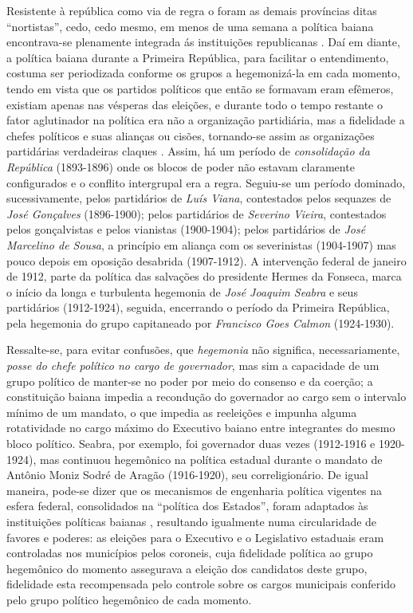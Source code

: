 Resistente à república como via de regra o foram as demais províncias ditas ``nortistas'', cedo, cedo mesmo, em menos de uma semana a política baiana encontrava-se plenamente integrada ás instituições republicanas \cite{sampaio_legislativo_1985}. Daí em diante, a política baiana durante a Primeira República, para facilitar o entendimento, costuma ser periodizada conforme os grupos a hegemonizá-la em cada momento, tendo em vista que os partidos políticos que então se formavam eram efêmeros, existiam apenas nas vésperas das eleições, e durante todo o tempo restante o fator aglutinador na política era não a organização partidiária, mas a fidelidade a chefes políticos e suas alianças ou cisões, tornando-se assim as organizações partidárias verdadeiras claques \cite[p.~18]{sampaio_partidos_1978}. Assim, há um período de \textit{consolidação da República} (1893-1896) onde os blocos de poder não estavam claramente configurados e o conflito intergrupal era a regra. Seguiu-se um período dominado, sucessivamente, pelos partidários de \textit{Luís Viana}, contestados pelos sequazes de \textit{José Gonçalves} (1896-1900); pelos partidários de \textit{Severino Vieira}, contestados pelos gonçalvistas e pelos vianistas (1900-1904); pelos partidários de \textit{José Marcelino de Sousa}, a princípio em aliança com os severinistas (1904-1907) mas pouco depois em oposição desabrida (1907-1912). A intervenção federal de janeiro de 1912, parte da política das salvações do presidente Hermes da Fonseca, marca o início da longa e turbulenta hegemonia de \textit{José Joaquim Seabra} e seus partidários (1912-1924), seguida, encerrando o período da Primeira República, pela hegemonia do grupo capitaneado por \textit{Francisco Goes Calmon} (1924-1930). 

Ressalte-se, para evitar confusões, que \textit{hegemonia} não significa, necessariamente, \textit{posse do chefe político no cargo de governador}, mas sim a capacidade de um grupo político de manter-se no poder por meio do consenso e da coerção; a constituição baiana impedia a recondução do governador ao cargo sem o intervalo mínimo de um mandato, o que impedia as reeleições e impunha alguma rotatividade no cargo máximo do Executivo baiano entre integrantes do mesmo bloco político. Seabra, por exemplo, foi governador duas vezes (1912-1916 e 1920-1924), mas continuou hegemônico na política estadual durante o mandato de Antônio Moniz Sodré de Aragão (1916-1920), seu correligionário. De igual maneira, pode-se dizer que os mecanismos de engenharia política vigentes na esfera federal, consolidados na ``política dos Estados'', foram adaptados às instituições políticas baianas \cite{sampaio_legislativo_1985}, resultando igualmente numa circularidade de favores e poderes: as eleições para o Executivo e o Legislativo estaduais eram controladas nos municípios pelos coroneis, cuja fidelidade política ao grupo hegemônico do momento assegurava a eleição dos candidatos deste grupo, fidelidade esta recompensada pelo controle sobre os cargos municipais conferido pelo grupo político hegemônico de cada momento.

